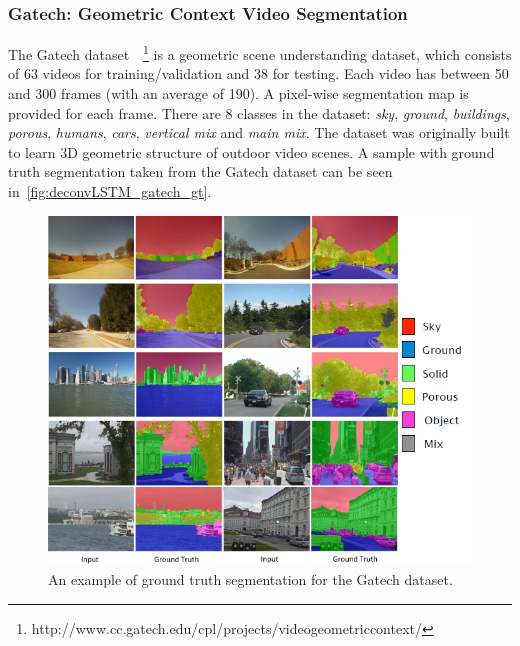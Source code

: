 \subsubsection{Gatech: Geometric Context Video Segmentation}
\label{sec:deconvLSTM_gatech}
The Gatech dataset~\citep{VideoGeometricContext2013}~\footnote{%
http://www.cc.gatech.edu/cpl/projects/videogeometriccontext/}
is a geometric scene understanding dataset, which consists of 63 videos for
training/validation and 38 for testing. Each video has between 50 and 300
frames (with an average of 190). A pixel-wise segmentation map is provided for
each frame. There are 8 classes in the dataset: \textit{sky}, \textit{ground},
\textit{buildings}, \textit{porous}, \textit{humans}, \textit{cars},
\textit{vertical mix} and \textit{main mix}. The dataset was originally built
to learn 3D geometric structure of outdoor video scenes. A sample with ground
truth segmentation taken from the Gatech dataset can be seen
in~\autoref{fig:deconvLSTM_gatech_gt}.

\begin{figure}[t]
    \centering
    \includegraphics[width=\columnwidth]{img/deconvLSTM/gatech_gt.png}
    \caption{An example of ground truth segmentation for the Gatech dataset.}
    \label{fig:deconvLSTM_gatech_gt}
\end{figure}


